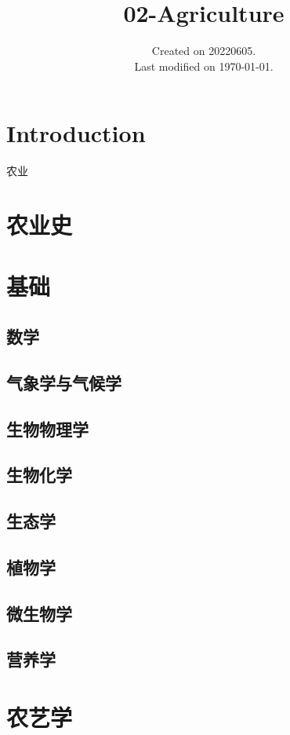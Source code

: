 \documentclass[UTF8]{../ApplicationUniverse}
\begin{document}
\title{02-Agriculture}
\date{Created on 20220605.\\   Last modified on \today.}
\maketitle
\tableofcontents


\chapter{Introduction}

农业

\chapter{农业史}

\chapter{基础}
\section{数学}
\section{气象学与气候学}
\section{生物物理学}
\section{生物化学}
\section{生态学}
\section{植物学}
\section{微生物学}
\section{营养学}

\chapter{农艺学}
\end{document}
